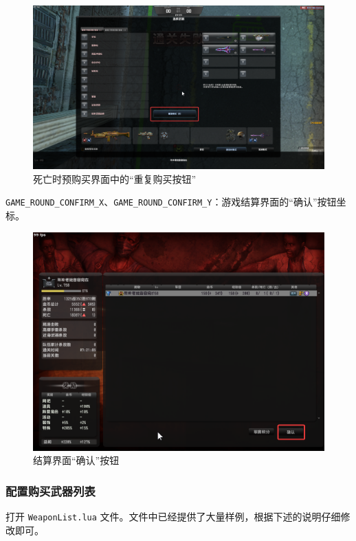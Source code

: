 \begin{figure}[H]
    \Centering
    \includegraphics[width=\textwidth]{docs/assets/dead_purchase_rebuy.png}
    \caption{死亡时预购买界面中的“重复购买按钮”}
\end{figure}

\lstinline{GAME_ROUND_CONFIRM_X}、\lstinline{GAME_ROUND_CONFIRM_Y}：游戏结算界面的“确认”按钮坐标。

\begin{figure}[H]
    \Centering
    \includegraphics[width=\textwidth]{docs/assets/confirm_round.png}
    \caption{结算界面“确认”按钮}
\end{figure}

\subsubsection{配置购买武器列表}

打开 \lstinline{WeaponList.lua} 文件。文件中已经提供了大量样例，根据下述的说明仔细修改即可。

